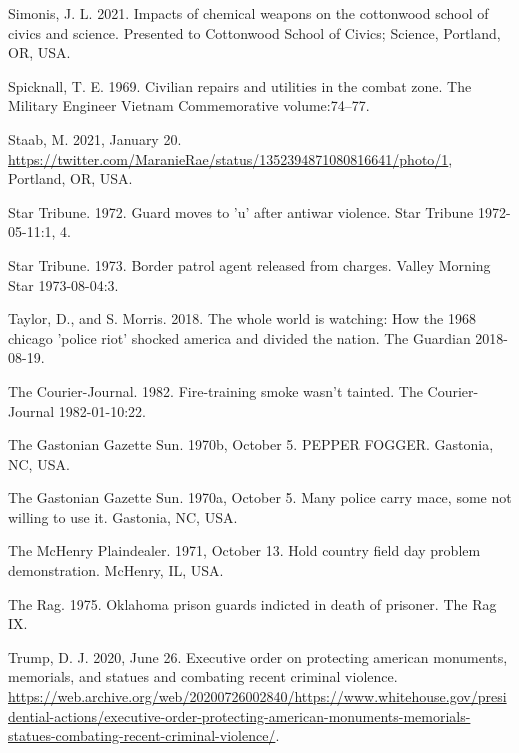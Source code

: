 \documentclass[
  11pt,
]{krantz}
\newlength{\cslhangindent}
\newlength{\cslentryspacingunit} %
\newenvironment{CSLReferences}[2] %
 {%
  \setlength{\parindent}{0pt}
  \ifodd #1
  \let\oldpar\par
  \def\par{\hangindent=\cslhangindent\oldpar}
  \fi
  \setlength{\parskip}{#2\cslentryspacingunit}
 }%
 {}
\begin{document}
\begin{CSLReferences}{1}{0}
\leavevmode{}%
Simonis, J. L. 2021. Impacts of chemical weapons on the cottonwood school of civics and science. Presented to Cottonwood School of Civics; Science, Portland, OR, USA.

\leavevmode{}%
Spicknall, T. E. 1969. Civilian repairs and utilities in the combat zone. The Military Engineer Vietnam Commemorative volume:74--77.

\leavevmode{}%
Staab, M. 2021, January 20. \url{https://twitter.com/MaranieRae/status/1352394871080816641/photo/1}, Portland, OR, USA.

\leavevmode{}%
Star Tribune. 1972. Guard moves to 'u' after antiwar violence. Star Tribune 1972-05-11:1, 4.

\leavevmode{}%
Star Tribune. 1973. Border patrol agent released from charges. Valley Morning Star 1973-08-04:3.

\leavevmode{}%
Taylor, D., and S. Morris. 2018. The whole world is watching: How the 1968 chicago 'police riot' shocked america and divided the nation. The Guardian 2018-08-19.

\leavevmode{}%
The Courier-Journal. 1982. Fire-training smoke wasn't tainted. The Courier-Journal 1982-01-10:22.

\leavevmode{}%
The Gastonian Gazette Sun. 1970b, October 5. PEPPER FOGGER. Gastonia, NC, USA.

\leavevmode{}%
The Gastonian Gazette Sun. 1970a, October 5. Many police carry mace, some not willing to use it. Gastonia, NC, USA.

\leavevmode{}%
The McHenry Plaindealer. 1971, October 13. Hold country field day problem demonstration. McHenry, IL, USA.

\leavevmode{}%
The Rag. 1975. Oklahoma prison guards indicted in death of prisoner. The Rag IX.

\leavevmode{}%
Trump, D. J. 2020, June 26. Executive order on protecting american monuments, memorials, and statues and combating recent criminal violence. \url{https://web.archive.org/web/20200726002840/https://www.whitehouse.gov/presidential-actions/executive-order-protecting-american-monuments-memorials-statues-combating-recent-criminal-violence/}.


\end{CSLReferences}
\end{document}
